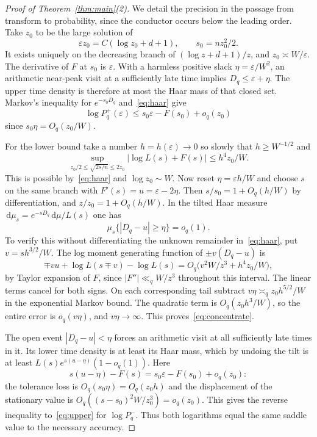 \documentclass[11pt]{article}
\newcommand{\eps}{\varepsilon}\newcommand{\rd}{\operatorname{rd}}\newcommand{\EE}{\mathbb E}\newcommand{\PP}{\mathbb P}
\newcommand{\dd}{\,\mathrm d}\newcommand{\meas}{\operatorname{meas}}
\begin{document}
\begin{proof}[Proof of Theorem~\ref{thm:main}(2)]
We detail the precision in the passage from transform to probability, since the conductor occurs below the leading order. Take $z_0$ to be the large solution of
\[
 \eps z_0=C(\log z_0+d+1),\qquad s_0=nz_0^2/2 .
\]
It exists uniquely on the decreasing branch of $(\log z+d+1)/z$, and $z_0\asymp W/\eps$. The derivative of $F$ at $s_0$ is $\eps$. With a harmless positive slack $\eta=\eps/W^2$, an arithmetic near-peak visit at a sufficiently late time implies $D_q\le\eps+\eta$. The upper time density is therefore at most the Haar mass of that closed set. Markov's inequality for $e^{-s_0D_q}$ and~\eqref{eq:haar} give
\begin{equation}\label{eq:upper}
 \log P_q^+(\eps)\le s_0\eps-F(s_0)+o_q(z_0)
\end{equation}
since $s_0\eta=O_q(z_0/W)$.

For the lower bound take a number $h=h(\eps)\to0$ so slowly that $h\ge W^{-1/2}$ and
\[
 \sup_{z_0/2\le\sqrt{2s/n}\le 2z_0}|\log L(s)+F(s)|\le h^4 z_0/W .
\]
This is possible by~\eqref{eq:haar} and $\log z_0\sim W$. Now reset $\eta=\eps h/W$ and choose $s$ on the same branch with $F'(s)=u=\eps-2\eta$. Then $s/s_0=1+O_q(h/W)$ by differentiation, and $z/z_0=1+O_q(h/W)$. In the tilted Haar measure $\dd\mu_s=e^{-sD_q}\dd\mu/L(s)$ one has
\begin{equation}\label{eq:concentrate}
 \mu_s\{|D_q-u|\ge\eta\}=o_q(1).
\end{equation}
To verify this without differentiating the unknown remainder in~\eqref{eq:haar}, put $v=s h^{3/2}/W$. The log moment generating function of $\pm v(D_q-u)$ is
\[
 \mp vu+\log L(s\mp v)-\log L(s)
 =O_q\bigl(v^2 W/z^3+h^4 z_0/W\bigr),
\]
by Taylor expansion of $F$, since $|F''|\ll_q W/z^3$ throughout this interval. The linear terms cancel for both signs. On each corresponding tail subtract $v\eta\asymp_q z_0 h^{5/2}/W$ in the exponential Markov bound. The quadratic term is $O_q(z_0 h^3/W)$, so the entire error is $o_q(v\eta)$, and $v\eta\to\infty$. This proves~\eqref{eq:concentrate}.

The open event $|D_q-u|<\eta$ forces an arithmetic visit at all sufficiently late times in it. Its lower time density is at least its Haar mass, which by undoing the tilt is at least $L(s)e^{s(u-\eta)}(1-o_q(1))$. Here
\[
 s(u-\eta)-F(s)=s_0\eps-F(s_0)+o_q(z_0):
\]
the tolerance loss is $O_q(s_0\eta)=O_q(z_0 h)$ and the displacement of the stationary value is $O_q((s-s_0)^2W/z_0^3)=o_q(z_0)$. This gives the reverse inequality to~\eqref{eq:upper} for $\log P_q^-$. Thus both logarithms equal the same saddle value to the necessary accuracy.


\end{proof}
\end{document}
